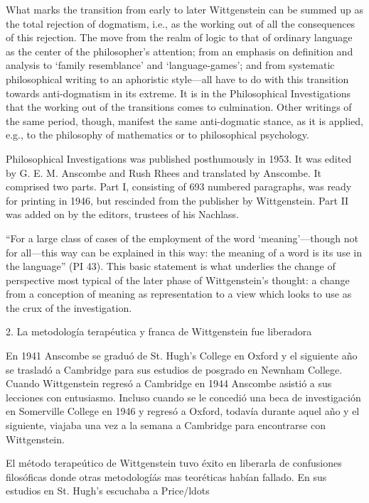   \begin{revision}
  What marks the transition from early to later Wittgenstein can be summed up as
  the total rejection of dogmatism, i.e., as the working out of all the
  consequences of this rejection. The move from the realm of logic to that of
  ordinary language as the center of the philosopher's attention; from an emphasis
  on definition and analysis to ‘family resemblance’ and ‘language-games’; and
  from systematic philosophical writing to an aphoristic style—all have to do with
  this transition towards anti-dogmatism in its extreme. It is in the
  Philosophical Investigations that the working out of the transitions comes to
  culmination. Other writings of the same period, though, manifest the same
  anti-dogmatic stance, as it is applied, e.g., to the philosophy of mathematics
  or to philosophical psychology.
  \end{revision}


  \begin{revision}
  Philosophical Investigations was published posthumously in 1953. It was edited
  by G. E. M. Anscombe and Rush Rhees and translated by Anscombe. It comprised two
  parts. Part I, consisting of 693 numbered paragraphs, was ready for printing in
  1946, but rescinded from the publisher by Wittgenstein. Part II was added on by
  the editors, trustees of his Nachlass. 
  \end{revision}

  \begin{revision}
  ``For a large class of cases of the employment of the word ‘meaning’—though not
  for all—this way can be explained in this way: the meaning of a word is its use
  in the language'' (PI 43). This basic statement is what underlies the change of
  perspective most typical of the later phase of Wittgenstein's thought: a change
  from a conception of meaning as representation to a view which looks to use as
  the crux of the investigation. 
  \end{revision}

  2. La metodología terapéutica y franca de Wittgenstein fue liberadora
  \begin{revision}


  En 1941 Anscombe se graduó de St. Hugh's College en Oxford y el siguiente año se
  trasladó a Cambridge para sus estudios de posgrado en Newnham College. Cuando
  Wittgenstein regresó a Cambridge en 1944 Anscombe asistió a sus lecciones con
  entusiasmo. Incluso cuando se le concedió una beca de investigación en
  Somerville College en 1946 y regresó a Oxford, todavía durante aquel año y el
  siguiente, viajaba una vez a la semana a Cambridge para encontrarse con
  Wittgenstein.  

  El método terapeútico de Wittgenstein tuvo éxito en liberarla de confusiones
  filosóficas donde otras metodologíás mas teoréticas habían fallado. En sus
  estudios en St. Hugh's escuchaba a Price/ldots
  \end{revision}

